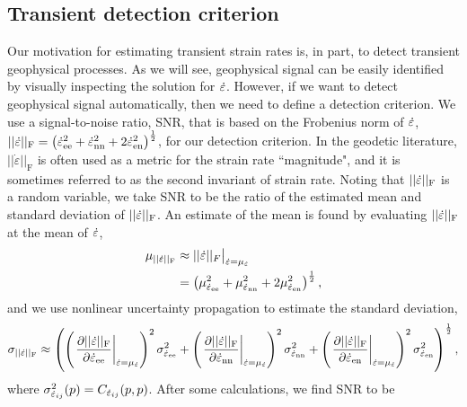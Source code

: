 \documentclass[extra,mreferee]{gji}
\begin{document}
\subsection{Transient detection criterion}\label{sec:TransientDetection}

Our motivation for estimating transient strain rates is, in part, to
detect transient geophysical processes. As we will see, geophysical
signal can be easily identified by visually inspecting the solution
for $\dot\varepsilon$. However, if we want to detect geophysical signal
automatically, then we need to define a detection criterion. We use a
signal-to-noise ratio, SNR, that is based on the Frobenius norm of
$\dot\varepsilon$, $||\dot\varepsilon||_\mathrm{F} = \left(\dot\varepsilon_{\mathrm{e}\mathrm{e}}^2 +
\dot\varepsilon_{\mathrm{n}\mathrm{n}}^2 + 2\dot\varepsilon_{\mathrm{e}\mathrm{n}}^2\right)^{\frac{1}{2}}$, for our
detection criterion. In the geodetic literature,
$||\dot{\varepsilon}||_\mathrm{F}$ is often used as a metric for the
strain rate ``magnitude", and it is sometimes referred to as the
second invariant of strain rate. Noting that $||\dot\varepsilon||_\mathrm{F}$
is a random variable, we take SNR to be the ratio of the estimated
mean and standard deviation of $||\dot\varepsilon||_\mathrm{F}$. An estimate
of the mean is found by evaluating $||\dot\varepsilon||_\mathrm{F}$ at the
mean of $\dot\varepsilon$,
\begin{align}
\mu_{||\dot\varepsilon||_\mathrm{F}} &\approx ||\dot\varepsilon||_F \big|_{\dot\varepsilon = \mu_{\dot\varepsilon}} \nonumber \\
                             &= \left(\mu_{\dot\varepsilon_{\mathrm{e}\mathrm{e}}}^2 + 
                                      \mu_{\dot\varepsilon_{\mathrm{n}\mathrm{n}}}^2 + 
                                      2\mu_{\dot\varepsilon_{\mathrm{e}\mathrm{n}}}^2 \right)^\frac{1}{2},
\end{align}
and we use nonlinear uncertainty propagation to estimate the standard
deviation,
\begin{equation}
\sigma_{||\dot\varepsilon||_\mathrm{F}} \approx
\left( \left(\left. \frac{\partial ||\dot\varepsilon||_\mathrm{F}}{\partial \dot\varepsilon_{\mathrm{e}\mathrm{e}}}\right|_{\dot\varepsilon = \mu_{\dot\varepsilon}} \right)^2 
       \sigma^2_{\dot\varepsilon_{\mathrm{e}\mathrm{e}}} +
       \left(\left. \frac{\partial ||\dot\varepsilon||_\mathrm{F}}{\partial \dot\varepsilon_{\mathrm{n}\mathrm{n}}}\right|_{\dot\varepsilon = \mu_{\dot\varepsilon}} \right)^2
       \sigma^2_{\dot\varepsilon_{\mathrm{n}\mathrm{n}}} +
       \left(\left. \frac{\partial ||\dot\varepsilon||_\mathrm{F}}{\partial \dot\varepsilon_{\mathrm{e}\mathrm{n}}}\right|_{\dot\varepsilon = \mu_{\dot\varepsilon}} \right)^2 
       \sigma^2_{\dot\varepsilon_{\mathrm{e}\mathrm{n}}} \right)^\frac{1}{2},
\end{equation}
where $\sigma^2_{\dot\varepsilon_{ij}}(p) = C_{\dot\varepsilon_{ij}}(p,p)$. After some
calculations, we find SNR to be
\end{document}
